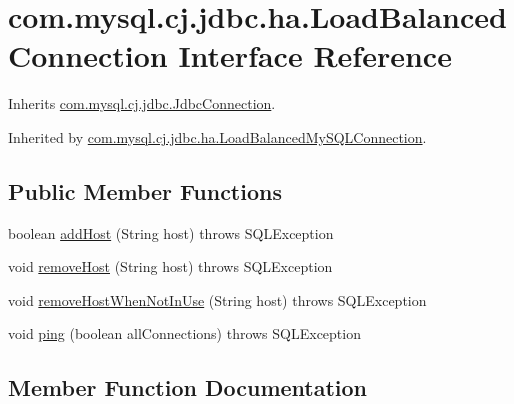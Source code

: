 \hypertarget{interfacecom_1_1mysql_1_1cj_1_1jdbc_1_1ha_1_1_load_balanced_connection}{}\section{com.\+mysql.\+cj.\+jdbc.\+ha.\+Load\+Balanced\+Connection Interface Reference}
\label{interfacecom_1_1mysql_1_1cj_1_1jdbc_1_1ha_1_1_load_balanced_connection}


Inherits \mbox{\hyperlink{interfacecom_1_1mysql_1_1cj_1_1jdbc_1_1_jdbc_connection}{com.\+mysql.\+cj.\+jdbc.\+Jdbc\+Connection}}.



Inherited by \mbox{\hyperlink{classcom_1_1mysql_1_1cj_1_1jdbc_1_1ha_1_1_load_balanced_my_s_q_l_connection}{com.\+mysql.\+cj.\+jdbc.\+ha.\+Load\+Balanced\+My\+S\+Q\+L\+Connection}}.

\subsection*{Public Member Functions}
\begin{DoxyCompactItemize}
\item 
boolean \mbox{\hyperlink{interfacecom_1_1mysql_1_1cj_1_1jdbc_1_1ha_1_1_load_balanced_connection_a25dd02bb1c6b28d3c639e447439e2f79}{add\+Host}} (String host)  throws S\+Q\+L\+Exception
\item 
void \mbox{\hyperlink{interfacecom_1_1mysql_1_1cj_1_1jdbc_1_1ha_1_1_load_balanced_connection_a41b452c0ebbd9f7dd3f8a8d6958df670}{remove\+Host}} (String host)  throws S\+Q\+L\+Exception
\item 
void \mbox{\hyperlink{interfacecom_1_1mysql_1_1cj_1_1jdbc_1_1ha_1_1_load_balanced_connection_a752d8892b856e9acc215aeaa9fe293ef}{remove\+Host\+When\+Not\+In\+Use}} (String host)  throws S\+Q\+L\+Exception
\item 
void \mbox{\hyperlink{interfacecom_1_1mysql_1_1cj_1_1jdbc_1_1ha_1_1_load_balanced_connection_a25239c6d5650eed007db3f8a12ba3e6f}{ping}} (boolean all\+Connections)  throws S\+Q\+L\+Exception
\end{DoxyCompactItemize}


\subsection{Member Function Documentation}
\mbox{\label{interfacecom_1_1mysql_1_1cj_1_1jdbc_1_1ha_1_1_load_balanced_connection_a25dd02bb1c6b28d3c639e447439e2f79}} 
